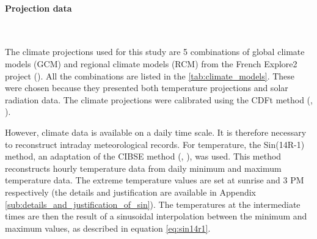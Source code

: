 \documentclass[11pt]{article}
\begin{document}
        \paragraph{Projection data}\mbox{}\\ %
        \label{par:proj_data}

        The climate projections used for this study are 5 combinations of global climate models (GCM) and regional climate models (RCM) from the French Explore2 project (\cite{sauquet_explore2_2021}). All the combinations are listed in the \ref{tab:climate_models}. These were chosen because they presented both temperature projections and solar radiation data. The climate projections were calibrated using the CDFt method (\cite{vrac_cdft_2009}, \cite{lavaysse_statistical_2012}).\\

        \begin{table}[ht]
            \caption{\label{tab:climate_models} The Explore2 simulations used in this study.}
        \end{table}

        However, climate data is available on a daily time scale. It is therefore necessary to reconstruct intraday meteorological records. For temperature, the Sin(14R-1) method, an adaptation of the CIBSE method (\cite{petherbridge_weather_1983}, \cite{chow_new_2007}), was used. This method reconstructs hourly temperature data from daily minimum and maximum temperature data. The extreme temperature values are set at sunrise and 3 PM respectively (the details and justification are available in Appendix \ref{sub:details_and_justification_of_sin}). The temperatures at the intermediate times are then the result of a sinusoidal interpolation between the minimum and maximum values, as described in equation \eqref{eq:sin14r1}.
\end{document}
